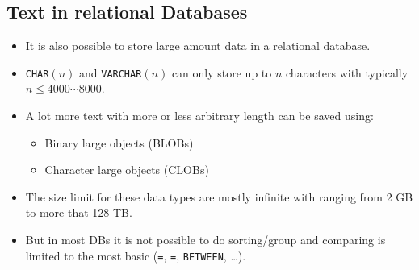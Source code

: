         \subsection{Text in relational Databases} %
        	\begin{itemize}
        		\item It is also possible to store large amount data in a relational database.
        		\item \lstinline|CHAR|\((n)\) and \lstinline|VARCHAR|\((n)\) can only store up to \(n\) characters with typically \( n \leq 4000\cdots8000 \).
        		\item A lot more text with more or less arbitrary length can be saved using:
        			\begin{itemize}
        				\item Binary large objects (BLOBs)
        				\item Character large objects (CLOBs)
        			\end{itemize}
        		\item The size limit for these data types are mostly infinite with ranging from 2 GB to more that 128 TB.
        		\item But in most DBs it is not possible to do sorting/group and comparing is limited to the most basic (\lstinline|=|, \lstinline|=|, \lstinline|BETWEEN|, \dots).
        	\end{itemize}

